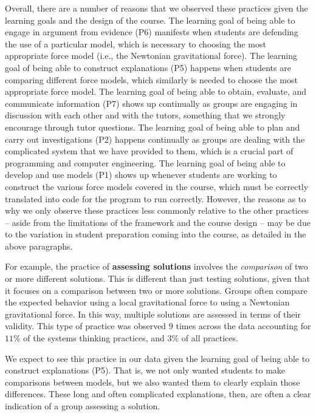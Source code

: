 \documentclass{msuphddissertation}
\begin{document}
\begin{doublespace}
Overall, there are a number of reasons that we observed these practices given the learning goals and the design of the course.  The learning goal of being able to engage in argument from evidence (P6) manifests when students are defending the use of a particular model, which is necessary to choosing the most appropriate force model (i.e., the Newtonian gravitational force).  The learning goal of being able to construct explanations (P5) happens when students are comparing different force models, which similarly is needed to choose the most appropriate force model.  The learning goal of being able to obtain, evaluate, and communicate information (P7) shows up continually as groups are engaging in discussion with each other and with the tutors, something that we strongly encourage through tutor questions.  The learning goal of being able to plan and carry out investigations (P2) happens continually as groups are dealing with the complicated system that we have provided to them, which is a crucial part of programming and computer engineering.  The learning goal of being able to develop and use models (P1) shows up whenever students are working to construct the various force models covered in the course, which must be correctly translated into code for the program to run correctly.  However, the reasons as to why we only observe these practices less commonly relative to the other practices -- aside from the limitations of the framework and the course design -- may be due to the variation in student preparation coming into the course, as detailed in the above paragraphs.

For example, the practice of \textbf{assessing solutions} involves the \textit{comparison} of two or more different solutions.  This is different than just testing solutions, given that it focuses on a comparison between two or more solutions.  Groups often compare the expected behavior using a local gravitational force to using a Newtonian gravitational force.  In this way, multiple solutions are assessed in terms of their validity.   This type of practice was observed $9$ times across the data  accounting for $11\%$ of the systems thinking practices, and $3\%$ of all practices.

We expect to see this practice in our data given the learning goal of being able to construct explanations (P5).  That is, we not only wanted students to make comparisons between models, but we also wanted them to clearly explain those differences.  These long and often complicated explanations, then, are often a clear indication of a group assessing a solution.  


\end{doublespace}
\end{document}
